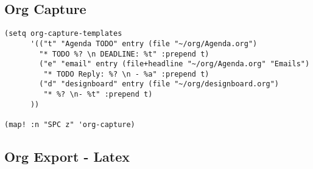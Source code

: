 \documentclass[8pt]{article}
\begin{document}
\subsection{Org Capture}
\label{sec:org3a05fb8}
\begin{verbatim}
(setq org-capture-templates
      '(("t" "Agenda TODO" entry (file "~/org/Agenda.org")
        "* TODO %? \n DEADLINE: %t" :prepend t)
        ("e" "email" entry (file+headline "~/org/Agenda.org" "Emails")
         "* TODO Reply: %? \n - %a" :prepend t)
        ("d" "designboard" entry (file "~/org/designboard.org")
         "* %? \n- %t" :prepend t)
      ))

(map! :n "SPC z" 'org-capture)
\end{verbatim}
\subsection{Org Export - Latex}
\label{sec:org63cf379}
\end{document}
